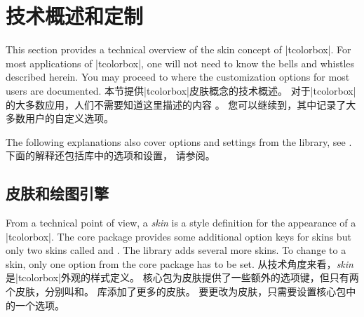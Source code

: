 \section{技术概述和定制}\label{sec:technical}%
%
\begin{stripedbox}
This section provides a technical overview of the skin concept of |tcolorbox|.
For most applications of |tcolorbox|, one will not need to know the bells and
whistles described herein.
You may proceed to  where the customization options
for most users are documented.
\tcblower
本节提供|tcolorbox|皮肤概念的技术概述。
对于|tcolorbox|的大多数应用，人们不需要知道这里描述的内容%
。
您可以继续到，其中记录了大多数用户的自定义选项。
\end{stripedbox}

\begin{stripedbox}
The following explanations also cover options and settings from the  library,
see  .
\tcblower
下面的解释还包括库中的选项和设置，
请参阅。
\end{stripedbox}

\subsection{皮肤和绘图引擎}\label{sec:skincorekeys}
\begin{stripedbox}
From a technical point of view, a \emph{skin} is a style definition for the
appearance of a |tcolorbox|. The core package provides some additional
option keys for skins but only two skins called 
and .
The  library adds several more skins. To change to a skin, only one
option from the core package has to be set.
\tcblower
从技术角度来看，\emph{skin}是|tcolorbox|外观的样式定义。%
核心包为皮肤提供了一些额外的选项键，但只有两个皮肤，分别叫和。%
库添加了更多的皮肤。%
要更改为皮肤，只需要设置核心包中的一个选项。
\end{stripedbox}

